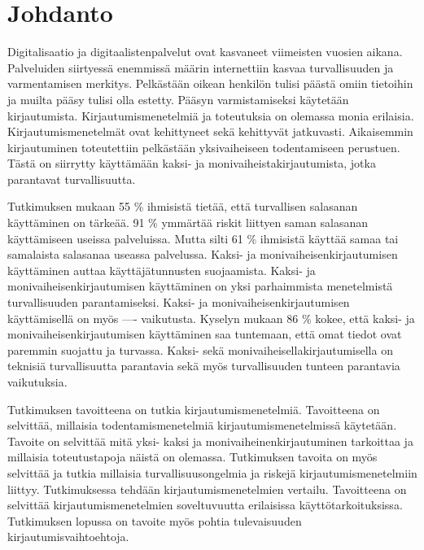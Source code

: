 \chapter{Johdanto\label{johdanto}}

Digitalisaatio ja digitaalistenpalvelut ovat kasvaneet viimeisten vuosien aikana. Palveluiden siirtyessä enemmissä määrin internettiin kasvaa turvallisuuden ja varmentamisen merkitys. Pelkästään oikean henkilön tulisi päästä omiin tietoihin ja muilta pääsy tulisi olla estetty. Pääsyn varmistamiseksi käytetään kirjautumista. Kirjautumismenetelmiä ja toteutuksia on olemassa monia erilaisia. Kirjautumismenetelmät ovat kehittyneet sekä kehittyvät jatkuvasti. Aikaisemmin kirjautuminen toteutettiin pelkästään yksivaiheiseen todentamiseen perustuen. Tästä on siirrytty käyttämään kaksi- ja monivaiheistakirjautumista, jotka parantavat turvallisuutta. \citep{cryptography2010001}

Tutkimuksen mukaan 55 \% ihmisistä tietää, että turvallisen salasanan käyttäminen on tärkeää. 91 \% ymmärtää riskit liittyen saman salasanan käyttämiseen useissa palveluissa. Mutta silti 61 \% ihmisistä käyttää samaa tai samalaista salasanaa useassa palvelussa. \cite{lastpass} Kaksi- ja monivaiheisenkirjautumisen käyttäminen auttaa käyttäjätunnusten suojaamista. Kaksi- ja monivaiheisenkirjautumisen käyttäminen on yksi parhaimmista menetelmistä turvallisuuden parantamiseksi.  \citep{top_security_practices} Kaksi- ja monivaiheisenkirjautumisen käyttämisellä on myös ---- vaikutusta. Kyselyn mukaan 86 \% kokee, että kaksi- ja monivaiheisenkirjautumisen käyttäminen saa tuntemaan, että omat tiedot ovat paremmin suojattu ja turvassa. \citep{nist_2fa} Kaksi- sekä monivaiheisellakirjautumisella on teknisiä turvallisuutta parantavia sekä myös turvallisuuden tunteen parantavia vaikutuksia.

Tutkimuksen tavoitteena on tutkia kirjautumismenetelmiä. Tavoitteena on selvittää, millaisia todentamismenetelmiä kirjautumismenetelmissä käytetään. Tavoite on selvittää mitä yksi- kaksi ja monivaiheinenkirjautuminen tarkoittaa ja millaisia toteutustapoja näistä on olemassa. Tutkimuksen tavoita on myös selvittää ja tutkia millaisia turvallisuusongelmia ja riskejä kirjautumismenetelmiin liittyy. Tutkimuksessa tehdään kirjautumismenetelmien vertailu. Tavoitteena on selvittää kirjautumismenetelmien soveltuvuutta erilaisissa käyttötarkoituksissa. Tutkimuksen lopussa on tavoite myös pohtia tulevaisuuden kirjautumisvaihtoehtoja. 

